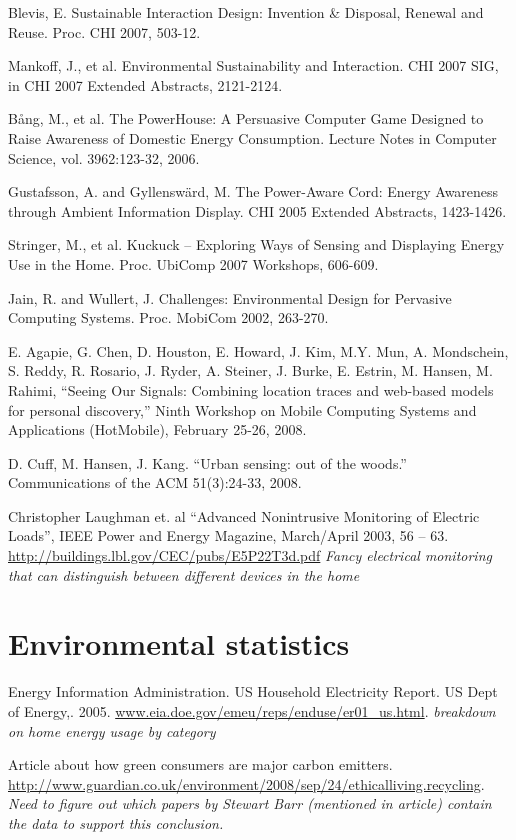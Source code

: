 Blevis, E.  Sustainable Interaction Design: Invention \& Disposal, Renewal and Reuse.  Proc. CHI 2007, 503-12.

Mankoff, J., et al.  Environmental Sustainability and Interaction.  CHI 2007 SIG, in CHI 2007 Extended Abstracts, 2121-2124.

Bång, M., et al. The PowerHouse: A Persuasive Computer Game Designed to Raise Awareness of Domestic Energy Consumption.  Lecture Notes in Computer Science, vol. 3962:123-32, 2006.

Gustafsson, A. and Gyllenswärd, M. The Power-Aware Cord: Energy Awareness through Ambient Information Display. CHI 2005 Extended Abstracts, 1423-1426.

Stringer, M., et al.  Kuckuck – Exploring Ways of Sensing and Displaying Energy Use in the Home.  Proc. UbiComp 2007 Workshops, 606-609.

Jain, R. and Wullert, J. Challenges: Environmental Design for Pervasive Computing Systems.  Proc. MobiCom 2002, 263-270.

E. Agapie, G. Chen, D. Houston, E. Howard, J. Kim, M.Y. Mun, A. Mondschein, S. Reddy, R. Rosario, J. Ryder, A. Steiner, J. Burke, E. Estrin, M. Hansen, M. Rahimi, “Seeing Our Signals: Combining location traces and web-based models for personal discovery,” Ninth Workshop on Mobile Computing Systems and Applications (HotMobile), February 25-26, 2008.

D. Cuff, M. Hansen, J. Kang. “Urban sensing: out of the woods.” Communications of the ACM 51(3):24-33, 2008.

Christopher Laughman et. al ``Advanced Nonintrusive Monitoring of Electric Loads'', IEEE Power and Energy Magazine, March/April 2003, 56 – 63. \url{http://buildings.lbl.gov/CEC/pubs/E5P22T3d.pdf} \emph{Fancy electrical monitoring that can distinguish between different devices in the home}

\section{Environmental statistics}
Energy Information Administration. US Household Electricity Report. US Dept of Energy,. 2005. \url{www.eia.doe.gov/emeu/reps/enduse/er01_us.html}. \emph{breakdown on home energy usage by category}

Article about how green consumers are major carbon emitters. \url{http://www.guardian.co.uk/environment/2008/sep/24/ethicalliving.recycling}. \emph{Need to figure out which papers by Stewart Barr (mentioned in article) contain the data to support this conclusion.}

